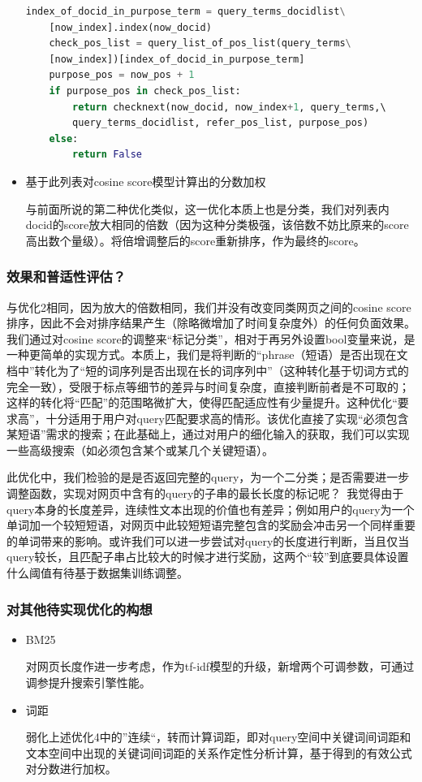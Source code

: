 \documentclass{ctexart}
\begin{document}
\begin{itemize}
\begin{lstlisting}[language=Python]
    index_of_docid_in_purpose_term = query_terms_docidlist\
    [now_index].index(now_docid)
    check_pos_list = query_list_of_pos_list(query_terms\
    [now_index])[index_of_docid_in_purpose_term]
    purpose_pos = now_pos + 1
    if purpose_pos in check_pos_list:
        return checknext(now_docid, now_index+1, query_terms,\ 
        query_terms_docidlist, refer_pos_list, purpose_pos)
    else:
        return False
\end{lstlisting}
\item 基于此列表对cosine score模型计算出的分数加权

与前面所说的第二种优化类似，这一优化本质上也是分类，我们对列表内docid的score放大相同的倍数（因为这种分类极强，该倍数不妨比原来的score高出数个量级）。将倍增调整后的score重新排序，作为最终的score。
\end{itemize}

\subsubsection{效果和普适性评估？}
与优化2相同，因为放大的倍数相同，我们并没有改变同类网页之间的cosine score排序，因此不会对排序结果产生（除略微增加了时间复杂度外）的任何负面效果。我们通过对cosine score的调整来“标记分类”，相对于再另外设置bool变量来说，是一种更简单的实现方式。本质上，我们是将判断的“phrase（短语）是否出现在文档中”转化为了“短的词序列是否出现在长的词序列中”（这种转化基于切词方式的完全一致），受限于标点等细节的差异与时间复杂度，直接判断前者是不可取的；这样的转化将“匹配”的范围略微扩大，使得匹配适应性有少量提升。这种优化“要求高”，十分适用于用户对query匹配要求高的情形。该优化直接了实现“必须包含某短语”需求的搜索；在此基础上，通过对用户的细化输入的获取，我们可以实现一些高级搜索（如必须包含某个或某几个关键短语）。

此优化中，我们检验的是是否返回完整的query，为一个二分类；是否需要进一步调整函数，实现对网页中含有的query的子串的最长长度的标记呢？ 我觉得由于query本身的长度差异，连续性文本出现的价值也有差异；例如用户的query为一个单词加一个较短短语，对网页中此较短短语完整包含的奖励会冲击另一个同样重要的单词带来的影响。或许我们可以进一步尝试对query的长度进行判断，当且仅当query较长，且匹配子串占比较大的时候才进行奖励，这两个“较”到底要具体设置什么阈值有待基于数据集训练调整。


\subsubsection{对其他待实现优化的构想}
\begin{itemize}
    \item BM25

    对网页长度作进一步考虑，作为tf-idf模型的升级，新增两个可调参数，可通过调参提升搜索引擎性能。

    \item 词距

    弱化上述优化4中的”连续“，转而计算词距，即对query空间中关键词间词距和文本空间中出现的关键词间词距的关系作定性分析计算，基于得到的有效公式对分数进行加权。
    
\end{itemize}
\end{document}
